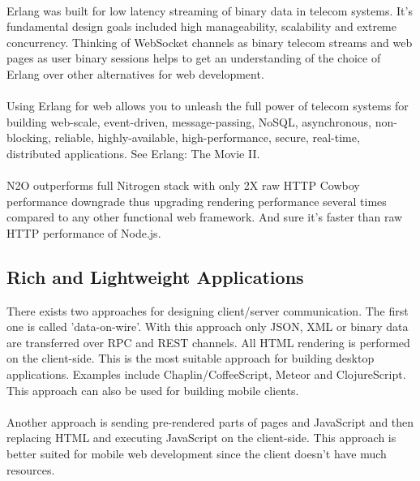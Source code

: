 
\paragraph{}
Erlang was built for low latency streaming of binary data in telecom systems.
It's fundamental design goals included high manageability, scalability
and extreme concurrency. Thinking of WebSocket channels as binary
telecom streams and web pages as user binary sessions
helps to get an understanding of the choice
of Erlang over other alternatives for web development.

\paragraph{}
Using Erlang for web allows you to unleash the full power of telecom systems for
building web-scale, event-driven, message-passing, NoSQL, asynchronous, non-blocking,
reliable, highly-available, high-performance, secure, real-time, distributed applications.
See Erlang: The Movie II.

\paragraph{}
N2O outperforms full Nitrogen stack with only 2X raw HTTP Cowboy
performance downgrade thus upgrading rendering performance several
times compared to any other functional web framework. And
sure it's faster than raw HTTP performance of Node.js.

\subsection{Rich and Lightweight Applications}
There exists two approaches for designing client/server communication.
The first one is called 'data-on-wire'. With this approach only JSON, XML or binary
data are transferred over RPC and REST channels. All HTML rendering
is performed on the client-side. This is the most suitable approach for building desktop
applications. Examples include Chaplin/CoffeeScript, Meteor
and ClojureScript. This approach can also be used for building mobile clients.

\paragraph{}
Another approach is sending pre-rendered parts of pages and JavaScript
and then replacing HTML and executing JavaScript on the client-side. This approach
is better suited for mobile web development since the
client doesn't have much resources.

